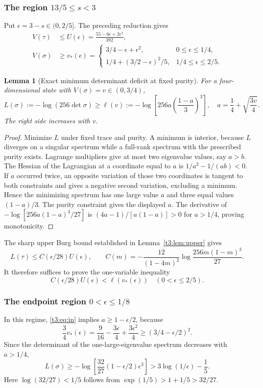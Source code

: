 \documentclass[11pt,a4paper]{article}
\newtheorem{lemma}{Lemma}
\begin{document}
\subsubsection{The region $13/5\le s<3$}
Put $\epsilon=3-s\in(0,2/5]$. The preceding reduction gives
\begin{align}
 V(\tau)&\le U(\epsilon)=\frac{55-6\epsilon+2\epsilon^2}{392},\label{t3:eq:out}\\
 V(\sigma)&\ge v_*(\epsilon)=
 \begin{cases}3/4-\epsilon+\epsilon^2,&0\le\epsilon\le1/4,\\
 1/4+(3/2-\epsilon)^2/5,&1/4\le\epsilon\le2/5.
 \end{cases}\label{t3:eq:in}
\end{align}
\begin{lemma}[Exact minimum determinant deficit at fixed purity]
For a four-dimensional state with $V(\sigma)=v\in(0,3/4)$,
\[
 L(\sigma):=-\log(256\det\sigma)\ge
 \ell(v):=-\log\!\left[256a\left(\frac{1-a}{3}\right)^3\right],
 \quad a=\frac14+\sqrt{\frac{3v}{4}}.
\]
The right side increases with $v$.
\end{lemma}
\begin{proof}
Minimize $L$ under fixed trace and purity. A minimum is interior,
because $L$ diverges on a singular spectrum while a full-rank
spectrum with the prescribed purity exists. Lagrange multipliers
give at most two eigenvalue values, say $a>b$.
The Hessian of the Lagrangian at a coordinate equal to $a$ is
$1/a^2-1/(ab)<0$. If $a$ occurred twice, an opposite variation
of those two coordinates is tangent to both constraints and gives
a negative second variation, excluding a minimum. Hence the
minimizing spectrum has one large value $a$ and three equal values
$(1-a)/3$. The purity constraint gives the displayed $a$.
The derivative of $-\log[256a(1-a)^3/27]$ is
$(4a-1)/[a(1-a)]>0$ for $a>1/4$, proving monotonicity.
\end{proof}

The sharp upper Burg bound established in Lemma~\ref{t3:lem:upper} gives
\[
 L(\tau)\le C(\epsilon/28)U(\epsilon),\qquad
 C(m)=-\frac{12}{(1-4m)^2}\log\frac{256m(1-m)^3}{27}.
\]
It therefore suffices to prove the one-variable inequality
\begin{equation}\label{t3:eq:goal}
 C(\epsilon/28)U(\epsilon)<\ell(v_*(\epsilon))
                  \quad(0<\epsilon\le2/5).
\end{equation}

\subsubsection{The endpoint region $0<\epsilon\le1/8$}
In this regime, \eqref{t3:eq:in} implies
$a\ge1-\epsilon/2$, because
\[
 \frac34v_*(\epsilon)
 =\frac9{16}-\frac{3\epsilon}{4}+\frac{3\epsilon^2}{4}
 \ge(3/4-\epsilon/2)^2.
\]
Since the determinant of the one-large-eigenvalue spectrum decreases
with $a>1/4$,
\[
 L(\sigma)\ge
 -\log\!\left[\frac{32}{27}(1-\epsilon/2)\epsilon^3\right]
 >3\log(1/\epsilon)-\frac15.
\]
Here $\log(32/27)<1/5$ follows from
$\exp(1/5)>1+1/5>32/27$.
\end{document}
